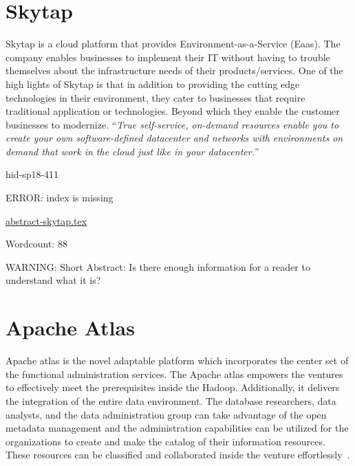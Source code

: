 \section{Skytap}

Skytap is a cloud platform that provides Environment-as-a-Service (Eaas). The
company enables businesses to implement their IT without having to
trouble themselves about the infrastructure needs of their products/services.
One of the high lights of Skytap is that in addition to providing the
cutting edge technologies in their environment, they cater to businesses that
require traditional application or technologies. Beyond which they enable the
customer businesses to modernize. \color{blue}``\emph{True self-service, on-demand resources
enable you to create your own software-defined datacenter and networks with
environments on demand that work in the cloud just like in your 
datacenter.}''\color{black}~\cite{hid-sp18-411-skytap}


\begin{IU}

hid-sp18-411

ERROR: index is missing

\href{https://github.com/cloudmesh-community/hid-sp18-411/blob/master//technology/abstract-skytap.tex}{abstract-skytap.tex}

 

Wordcount: 88

WARNING: Short Abstract: Is there enough information for a reader to understand what it is?

\end{IU}

\section{Apache Atlas}

Apache atlas is the novel adaptable platform which incorporates the
center set of the functional administration services. The Apache atlas
empowers the ventures to effectively meet the prerequisites inside the
Hadoop.  Additionally, it delivers the integration of the entire data
environment.  The database researchers, data analysts, and the data
administration group can take advantage of the open metadata
management and the administration capabilities can be utilized for the
organizations to create and make the catalog of their information
resources. These resources can be classified and collaborated inside
the venture effortlessly~\cite{hid-sp18-412-Apache_Atlas_by_Maven}.

